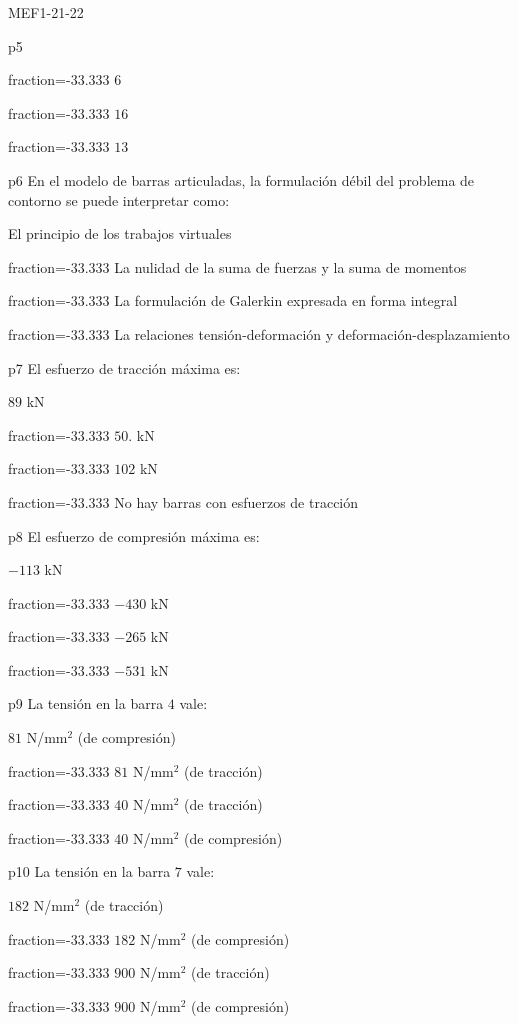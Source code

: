 \documentclass[a4paper]{article}
\begin{document}
\begin{quiz}{MEF1-21-22}
\begin{multi}{p5}
	\item[fraction=-33.333] $6$
	\item[fraction=-33.333] $16$
	\item[fraction=-33.333] $13$
\end{multi}
\begin{multi}{p6}
En el modelo de barras articuladas, la formulaci\'on d\'ebil del problema
de contorno se puede interpretar como:
	\item* El principio de los trabajos virtuales
	\item[fraction=-33.333] La nulidad de la suma de fuerzas y la suma de momentos
	\item[fraction=-33.333] La formulaci\'on de Galerkin expresada en forma integral
	\item[fraction=-33.333] La relaciones tensi\'on-deformaci\'on y deformaci\'on-desplazamiento
\end{multi}
\begin{multi}{p7}
El esfuerzo de tracci\'on m\'axima es:
	\item* $89$ kN
	\item[fraction=-33.333] $50.$ kN
	\item[fraction=-33.333] $102$ kN
	\item[fraction=-33.333] No hay barras con esfuerzos de tracci\'on
\end{multi}
\begin{multi}{p8}
El esfuerzo de compresi\'on m\'axima es:
	\item* $-113$ kN
	\item[fraction=-33.333] $-430$ kN
	\item[fraction=-33.333] $-265$ kN
	\item[fraction=-33.333] $-531$ kN
\end{multi}
\begin{multi}{p9}
La tensi\'on en la barra $4$ vale:
	\item* $81$ N/mm$^2$ (de compresi\'on)
	\item[fraction=-33.333] $81$ N/mm$^2$ (de tracci\'on)
	\item[fraction=-33.333] $40$ N/mm$^2$ (de tracci\'on)
	\item[fraction=-33.333] $40$ N/mm$^2$ (de compresi\'on)
\end{multi}
\begin{multi}{p10}
La tensi\'on en la barra $7$ vale:
	\item* $182$ N/mm$^2$ (de tracci\'on)
	\item[fraction=-33.333] $182$ N/mm$^2$ (de compresi\'on)
	\item[fraction=-33.333] $900$ N/mm$^2$ (de tracci\'on)
	\item[fraction=-33.333] $900$ N/mm$^2$ (de compresi\'on)
\end{multi}

\end{quiz}
\end{document}
